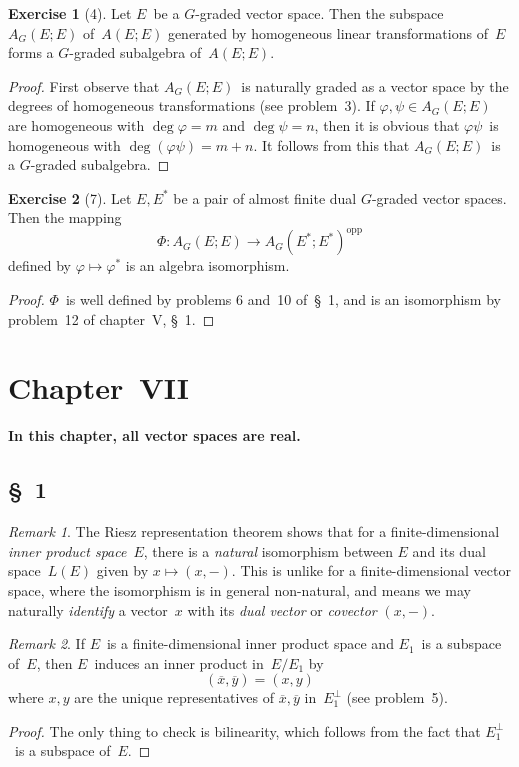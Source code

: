 \documentclass[letterpaper,12pt]{article}
\newcommand{\oc}[1]{#1^{\perp}}
\newcommand{\opp}[1]{#1^{\mathrm{opp}}}
\newcommand{\iprod}[2]{(#1,#2)}
\newcommand{\proj}[1]{\overline{#1}}
\theoremstyle{definition}
\newtheorem*{exer}{Exercise}
\theoremstyle{remark}
\newtheorem*{rmk}{Remark}
\begin{document}
\begin{exer}[4]
Let \(E\)~be a \(G\)-graded vector space. Then the subspace \(A_G(E;E)\) of~\(A(E;E)\) generated by homogeneous linear transformations of~\(E\) forms a \(G\)-graded subalgebra of~\(A(E;E)\).
\end{exer}
\begin{proof}
First observe that \(A_G(E;E)\)~is naturally graded as a vector space by the degrees of homogeneous transformations (see problem~3). If \(\varphi,\psi\in A_G(E;E)\) are homogeneous with \(\deg\varphi=m\) and \(\deg\psi=n\), then it is obvious that \(\varphi\psi\)~is homogeneous with \(\deg(\varphi\psi)=m+n\). It follows from this that \(A_G(E;E)\)~is a \(G\)-graded subalgebra.
\end{proof}

\begin{exer}[7]
Let \(E,E^*\) be a pair of almost finite dual \(G\)-graded vector spaces. Then the mapping
\[\Phi:A_G(E;E)\to\opp{A_G(E^*;E^*)}\]
defined by \(\varphi\mapsto\varphi^*\) is an algebra isomorphism.
\end{exer}
\begin{proof}
\(\Phi\)~is well defined by problems 6 and~10 of~\S~1, and is an isomorphism by problem~12 of chapter~V, \S~1.
\end{proof}

\section*{Chapter~VII}
\textbf{In this chapter, all vector spaces are real.}

\subsection*{\S~1}
\begin{rmk}
The Riesz representation theorem shows that for a finite-dimensional \emph{inner product space}~\(E\), there is a \emph{natural} isomorphism between \(E\) and its dual space~\(L(E)\) given by \(x\mapsto\iprod{x}{-}\). This is unlike for a finite-dimensional vector space, where the isomorphism is in general non-natural, and means we may naturally \emph{identify} a vector~\(x\) with its \emph{dual vector} or \emph{covector} \(\iprod{x}{-}\).
\end{rmk}

\begin{rmk}
If \(E\)~is a finite-dimensional inner product space and \(E_1\)~is a subspace of~\(E\), then \(E\)~induces an inner product in~\(E/E_1\) by
\[\iprod{\proj{x}}{\proj{y}}=\iprod{x}{y}\]
where \(x,y\) are the unique representatives of \(\proj{x},\proj{y}\) in~\(\oc{E_1}\) (see problem~5).
\end{rmk}
\begin{proof}
The only thing to check is bilinearity, which follows from the fact that \(\oc{E_1}\)~is a subspace of~\(E\).
\end{proof}
\end{document}
